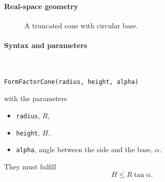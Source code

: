 \paragraph{Real-space geometry}

\begin{figure}[H]
\hfill
{}
\hfill
{}
\hfill
{}
\hfill
\caption{A truncated cone with circular base.}
\end{figure}

\paragraph{Syntax and parameters}\strut\\[-2ex plus .2ex minus .2ex]
\begin{lstlisting}[language=python, style=eclipseboxed,numbers=none,nolol]
  FormFactorCone(radius, height, alpha)
\end{lstlisting}
with the parameters
\begin{itemize}
\item \texttt{radius}, $R$,
\item \texttt{height}, $H$,
\item \texttt{alpha}, angle between the side and the base, $\alpha$.
\end{itemize}
They must fulfill
\begin{displaymath}
  H\le R\tan\alpha.
\end{displaymath}


